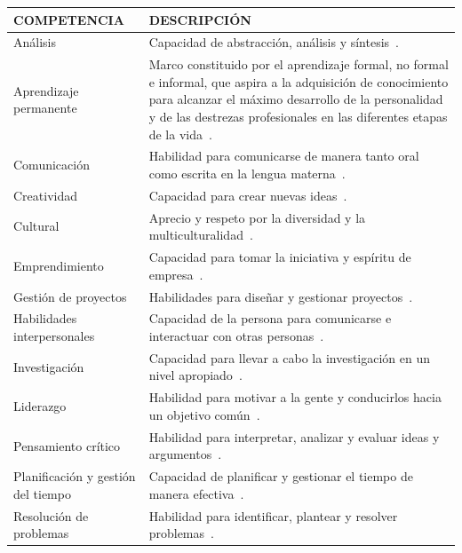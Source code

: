 \pagestyle{empty}
\begin{landscape}
  \begin{center}
\begin{longtable}{| m{6cm} | m{16cm} |}
    \hline
    COMPETENCIA & DESCRIPCIÓN \\
    \hline
    \hline
    Análisis & Capacidad de abstracción, análisis y síntesis~\cite{gonzalez2003tuning}.\\
    \hline
    Aprendizaje permanente & Marco constituido por el aprendizaje formal, no formal e informal, que aspira a la adquisición de conocimiento para alcanzar el máximo desarrollo de la personalidad y de las destrezas profesionales en las diferentes etapas de la vida~\cite{bernheim2010educacion}. \\
    \hline
    Comunicación & Habilidad para comunicarse de manera tanto oral como escrita en la lengua materna~\cite{gonzalez2003tuning}. \\
    \hline
    Creatividad & Capacidad para crear nuevas ideas~\cite{gonzalez2003tuning}. \\
    \hline
    Cultural & Aprecio y respeto por la diversidad y la multiculturalidad~\cite{gonzalez2003tuning}. \\
    \hline
    Emprendimiento & Capacidad para tomar la iniciativa y espíritu de empresa~\cite{gonzalez2003tuning}. \\
    \hline
    Gestión de proyectos & Habilidades para diseñar y gestionar proyectos~\cite{gonzalez2003tuning}. \\
    \hline
    Habilidades interpersonales & Capacidad de la persona para comunicarse e interactuar con otras personas~\cite{gonzalez2003tuning}. \\ %
    \hline    
    Investigación & Capacidad para llevar a cabo la investigación en un nivel apropiado~\cite{gonzalez2003tuning}.  \\
    \hline
    Liderazgo & Habilidad para motivar a la gente y conducirlos hacia un objetivo común~\cite{gonzalez2003tuning}. \\
    \hline
    Pensamiento crítico & Habilidad para interpretar, analizar y evaluar ideas y argumentos~\cite{fisher2011critical}. \\
    \hline
    Planificación y gestión del tiempo & Capacidad de planificar y gestionar el tiempo de manera efectiva~\cite{gonzalez2003tuning}. \\
    \hline
    Resolución de problemas & Habilidad para identificar, plantear y resolver problemas~\cite{gonzalez2003tuning}. \\

\end{longtable}
\end{center}
\end{landscape}
